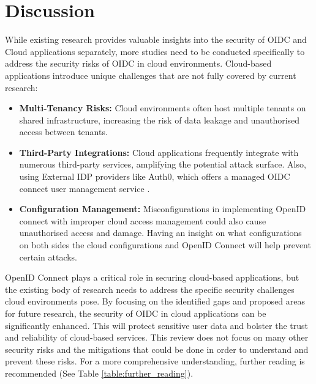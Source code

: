 \section{Discussion}

While existing research provides valuable insights into the security of OIDC and Cloud applications separately, more studies need to be conducted specifically to address the security risks of OIDC in cloud environments. Cloud-based applications introduce unique challenges that are not fully covered by current research:

\begin{itemize}
    \item  \textbf{Multi-Tenancy Risks:} Cloud environments often host multiple tenants on shared infrastructure, increasing the risk of data leakage and unauthorised access between tenants.

    \item \textbf{Third-Party Integrations:} Cloud applications frequently integrate with numerous third-party services, amplifying the potential attack surface. Also, using External IDP providers like Auth0, which offers a managed OIDC connect user management service \citep{auth0-main}.

    \item \textbf{Configuration Management:} Misconfigurations in implementing OpenID connect with improper cloud access management could also cause unauthorised access and damage. Having an insight on what configurations on both sides the cloud configurations and OpenID Connect will help prevent certain attacks.

\end{itemize}

OpenID Connect plays a critical role in securing cloud-based applications, but the existing body of research needs to address the specific security challenges cloud environments pose. By focusing on the identified gaps and proposed areas for future research, the security of OIDC in cloud applications can be significantly enhanced. This will protect sensitive user data and bolster the trust and reliability of cloud-based services. This review does not focus on many other security risks and the mitigations that could be done in order to understand and prevent these risks. For a more comprehensive understanding, further reading is recommended (See Table \ref{table:further_reading}).

